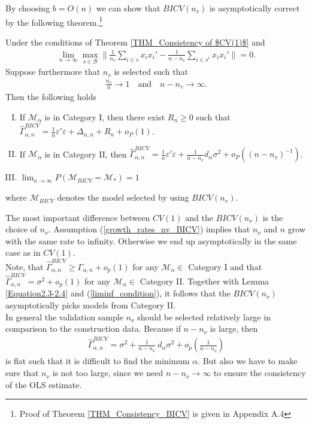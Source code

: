 \documentclass[Research_Module_ES.tex]{subfiles}
\begin{document}
By choosing $b=O(n)$ we can show that $BICV(n_v)$ is asymptotically correct by the following theorem.\footnote{Proof of Theorem \ref{THM_Consistency_BICV} is given in Appendix A.4}
\begin{thm}
	\label{THM_Consistency_BICV}
Under the conditions of Theorem \ref{THM_Consistency of $CV(1)$} and
\begin{align}
\lim_{n\to\infty} \max_{s\in \mathcal{B}}\biggl\lVert \frac{1}{n_v}\sum_{i\in s}x_ix_i' - \frac{1}{n-n_v}\sum_{i\in s^c}x_ix_i'\biggr\rVert =0. \label{gram_matrix_condition_BICV}
\end{align}
Suppose furthermore that $n_v$ is selected such that
\begin{align}
\frac{n_v}{n}\to 1 \quad \textrm{and} \quad n-n_v \to \infty. \label{growth_rates_nv_BICV}
\end{align}
Then the following holds
\begin{enumerate}[(I)]
\item If $\mathcal{M}_\alpha$ is in Category I, then there exist $R_n \ge 0$ such that $\hat{\Gamma}_{\alpha,n}^{BICV} = \frac{1}{n}\varepsilon'\varepsilon + \Delta_{\alpha,n} + R_n + o_P(1)$.
\item If $\mathcal{M}_\alpha$ is in Category II, then $\hat{\Gamma}_{\alpha,n}^{BICV} = \frac{1}{n}\varepsilon'\varepsilon + \frac{1}{n-n_v}d_\alpha\sigma^2  + o_P((n-n_v)^{-1})$.
\item $\lim_{n\to\infty}P(\mathcal{M}_{BICV}=\mathcal{M}_\ast) = 1$
\end{enumerate}
where $\mathcal{M}_{BICV}$ denotes the model selected by using $BICV(n_v)$.
\end{thm}
The most important difference between $CV(1)$ and the $BICV(n_\nu)$ is the choice of $n_\nu$. Assumption (\ref{growth_rates_nv_BICV}) implies that $n_\nu$ and $n$ grow with the same rate to infinity. Otherwise we end up asymptotically in the same case as in $CV(1)$.\\

Note, that $\hat{\Gamma}_{\alpha,n}^{BICV}\geq\Gamma_{\alpha,n}+o_p(1)$ for any $\mathcal{M}_\alpha\in$ Category I and that $\hat{\Gamma}_{\alpha,n}^{BICV}=\sigma^2+o_p(1)$ for any $\mathcal{M}_\alpha\in$ Category II. Together with Lemma \ref{Equation2.3-2.4} and (\ref{liminf_condition}), it follows that the $BICV(n_\nu)$ asymptotically picks models from Category II.\\

In general the validation sample $n_\nu$ should be selected relatively large in comparison to the construction data. Because if $n-n_\nu$ is large, then 
\begin{align*}
\hat{\Gamma}^{BICV}_{\alpha,n}=\sigma^2+\frac{1}{n-n_\nu}~d_\alpha\sigma^2+o_p\left(\frac{1}{n-n_\nu}\right)
\end{align*}
is flat such that it is difficult to find the minimum $\alpha$. But also we have to make sure that $n_\nu$ is not too large, since we need $n-n_\nu\to\infty$ to ensure the consistency of the OLS estimate.\\
\end{document}
